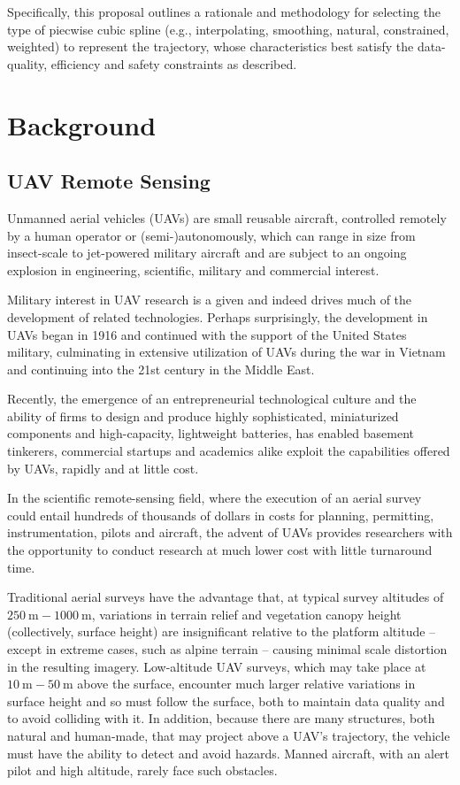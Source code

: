 \documentclass[doc]{apa6}
\begin{document}
Specifically, this proposal outlines a rationale and methodology for selecting the type of piecwise cubic spline (e.g., interpolating, smoothing, natural, constrained, weighted) to represent the trajectory, whose characteristics best satisfy the data-quality, efficiency and safety constraints as described. 



\section{Background}

\subsection{UAV Remote Sensing}

Unmanned aerial vehicles (UAVs) are small reusable aircraft, controlled remotely by a human operator or (semi-)autonomously, which can range in size from insect-scale to jet-powered military aircraft \parencite{Avadhanula2002,Deng2003} and are subject to an ongoing explosion in engineering, scientific, military and commercial interest. 

Military interest in UAV research is a given and indeed drives much of the development of related technologies. Perhaps surprisingly, the development in UAVs began in 1916 and continued with the support of the United States military, culminating in extensive utilization of UAVs during the war in Vietnam \parencite{Valavanis2007,Cook2007} and continuing into the 21st century in the Middle East. 

Recently, the emergence of an entrepreneurial technological culture and the ability of firms to design and produce highly sophisticated, miniaturized components and high-capacity, lightweight batteries, has enabled basement tinkerers, commercial startups and academics alike exploit the capabilities offered by UAVs, rapidly and at little cost.

In the scientific remote-sensing field, where the execution of an aerial survey could entail hundreds of thousands of dollars in costs for planning, permitting, instrumentation, pilots and aircraft, the advent of UAVs provides researchers with the opportunity to conduct research at much lower cost with little turnaround time. 

Traditional aerial surveys have the advantage that, at typical survey altitudes of $\SI{250}\m-\SI{1000}\m$, variations in terrain relief and vegetation canopy height (collectively, surface height) are insignificant relative to the platform altitude -- except in extreme cases, such as alpine terrain -- causing minimal scale distortion in the resulting imagery. Low-altitude UAV surveys, which may take place at $\SI{10}\m-\SI{50}\m$ above the surface, encounter much larger relative variations in surface height and so must follow the surface, both to maintain data quality and to avoid colliding with it. In addition, because there are many structures, both natural and human-made, that may project above a UAV's trajectory, the vehicle must have the ability to detect and avoid hazards. Manned aircraft, with an alert pilot and high altitude, rarely face such obstacles. 
\end{document}
